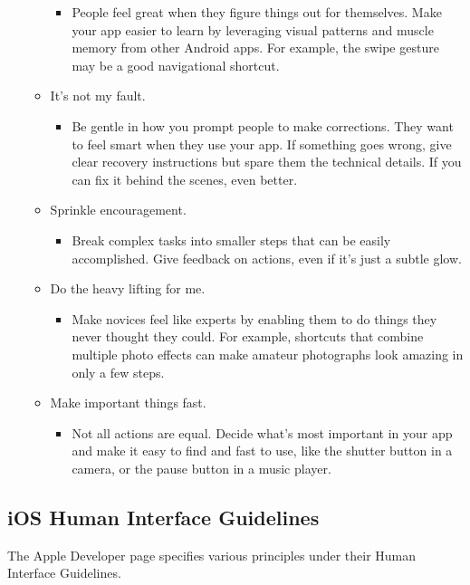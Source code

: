 \begin{itemize}
\begin{itemize}
\begin{itemize}
\item People feel great when they figure things out for themselves. Make your app easier to learn by leveraging visual patterns and muscle memory from other Android apps. For example, the swipe gesture may be a good navigational shortcut.
\end{itemize}
\item It's not my fault.
\begin{itemize}
\item Be gentle in how you prompt people to make corrections. They want to feel smart when they use your app. If something goes wrong, give clear recovery instructions but spare them the technical details. If you can fix it behind the scenes, even better.
\end{itemize}
\item Sprinkle encouragement.
\begin{itemize}
\item Break complex tasks into smaller steps that can be easily accomplished. Give feedback on actions, even if it's just a subtle glow.
\end{itemize}
\item Do the heavy lifting for me.
\begin{itemize}
\item Make novices feel like experts by enabling them to do things they never thought they could. For example, shortcuts that combine multiple photo effects can make amateur photographs look amazing in only a few steps.
\end{itemize}
\item Make important things fast.
\begin{itemize}
\item Not all actions are equal. Decide what's most important in your app and make it easy to find and fast to use, like the shutter button in a camera, or the pause button in a music player.
\end{itemize}
\end{itemize}
\end{itemize}
\newpage
\subsection*{iOS Human Interface Guidelines}
The Apple Developer page specifies various principles under their Human Interface Guidelines.

